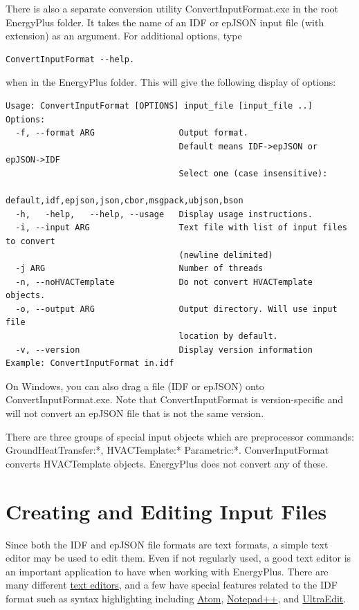 There is also a separate conversion utility ConvertInputFormat.exe in the root EnergyPlus folder.
It takes the name of an IDF or epJSON input file (with extension) as an argument. For additional options,
type 
\begin{verbatim}
ConvertInputFormat --help.
\end{verbatim}
when in the EnergyPlus folder. This will give the following display
of options:
\begin{verbatim}
Usage: ConvertInputFormat [OPTIONS] input_file [input_file ..]
Options:
  -f, --format ARG                 Output format.
                                   Default means IDF->epJSON or epJSON->IDF
                                   Select one (case insensitive):
                                   default,idf,epjson,json,cbor,msgpack,ubjson,bson
  -h,   -help,   --help, --usage   Display usage instructions.
  -i, --input ARG                  Text file with list of input files to convert
                                   (newline delimited)
  -j ARG                           Number of threads
  -n, --noHVACTemplate             Do not convert HVACTemplate objects.
  -o, --output ARG                 Output directory. Will use input file
                                   location by default.
  -v, --version                    Display version information
Example: ConvertInputFormat in.idf
\end{verbatim}

On Windows, you can also drag a file (IDF or epJSON) onto ConvertInputFormat.exe.
Note that ConvertInputFormat is version-specific and will not convert an epJSON file that is not the same version.

There are three groups of special input objects which are preprocessor commands: GroundHeatTransfer:*,
HVACTemplate:* Parametric:*. ConverInputFormat converts HVACTemplate objects.  EnergyPlus does not convert any of these.


\section{Creating and Editing Input Files}

Since both the IDF and epJSON file formats are text formats, a simple
text editor may be used to edit them. Even if not regularly used,
a good text editor is an important application to have when working
with EnergyPlus. There are many different \href{https://en.wikipedia.org/wiki/Comparison_of_text_editors}{text editors},
and a few have special features related to the IDF format such as
syntax highlighting including \href{https://github.com/bigladder/atom-language-energyplus}{Atom},
\href{https://github.com/jmarrec/notepad}{Notepad++}, and \href{http://energyplus.helpserve.com/knowledgebase/article/View/102/47/ultraedit-syntax-highlighting-file---v80}{UltraEdit}.

